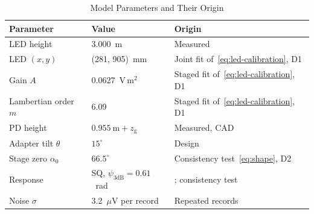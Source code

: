\begin{table}[!t]
 \centering
 \caption{Model Parameters and Their Origin}
 \label{tab:parameters}
 \footnotesize
 \setlength{\tabcolsep}{3pt}
 \begin{tabular}{@{}lll@{}}
 \toprule
 Parameter & Value & Origin\\
 \midrule
 LED height & 3.000~m & Measured\\
 LED $(x,y)$ & (281, 905)~mm & Joint fit of~\eqref{eq:led-calibration}, D1\\
 Gain $A$ & 0.0627~V\,m$^2$ & Staged fit of~\eqref{eq:led-calibration}, D1\\
 Lambertian order $m$ & 6.09 & Staged fit of~\eqref{eq:led-calibration}, D1\\
 PD height & $0.955~\mathrm m+z_{\mathrm g}$ & Measured, CAD\\
 Adapter tilt $\theta$ & $15^\circ$ & Design\\
 Stage zero $\alpha_0$ & $66.5^\circ$ & Consistency test~\eqref{eq:shape}, D2\\
 Response & SQ, $\psi_{3\mathrm{dB}}=0.61$~rad & \cite{Bastiaens2020}; consistency test\\
 Noise $\sigma$ & 3.2~$\mu$V per record & Repeated records\\
 \bottomrule
 \end{tabular}
\end{table}


